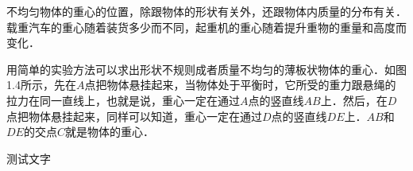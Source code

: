 \begin{Quiz}
不均匀物体的重心的位置，除跟物体的形状有关外，还跟物体内质量的分布有关．载重汽车的重心随着装货多少而不同，起重机的重心随着提升重物的重量和高度而变化．

用简单的实验方法可以求出形状不规则成者质量不均匀的薄板状物体的重心．如图1.4所示，先在$A$点把物体悬挂起来，当物体处于平衡时，它所受的重力跟悬绳的拉力在同一直线上，也就是说，重心一定在通过$A$点的竖直线$AB$上．然后，在$D$点把物体悬挂起来，同样可以知道，重心一定在通过$D$点的竖直线$DE$上．$AB$和$DE$的交点$C$就是物体的重心．

\begin{Exercise}
	\begin{QsNum}
		\item 测试文字
	\end{QsNum}
\end{Exercise}

\end{Quiz}



